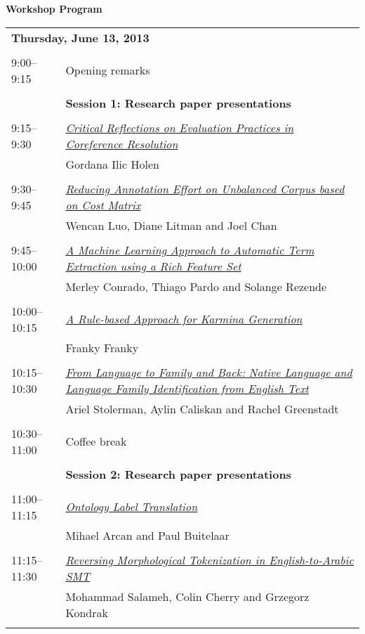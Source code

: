 \setlength{\parindent}{0in}
\setlength{\parskip}{2ex}
\renewcommand{\baselinestretch}{0.87}

\begin{center}
{\Large \bf
  Workshop Program
}
\end{center}
\vspace{3mm}
\begin{tabular}{p{20mm}p{128mm}}
\multicolumn{2}{l}{\bf Thursday, June 13, 2013
} \\
\\
9:00--9:15 & Opening remarks
 \\
\\
 & {\bf Session 1: Research paper presentations
} \\
\\
9:15--9:30 & \hyperlink{page.1}{\em Critical Reflections on Evaluation Practices in Coreference Resolution}\\
         & Gordana Ilic Holen \\
\\

9:30--9:45 & \hyperlink{page.8}{\em Reducing Annotation Effort on Unbalanced Corpus based on Cost Matrix}\\
         & Wencan Luo, Diane Litman and Joel Chan \\
\\

9:45--10:00 & \hyperlink{page.16}{\em A Machine Learning Approach to Automatic Term Extraction using a Rich Feature Set}\\
         & Merley Conrado, Thiago Pardo and Solange Rezende \\
\\

10:00--10:15 & \hyperlink{page.24}{\em A Rule-based Approach for Karmina Generation}\\
         & Franky Franky \\
\\

10:15--10:30 & \hyperlink{page.32}{\em From Language to Family and Back: Native Language and Language Family Identification from English Text}\\
         & Ariel Stolerman, Aylin Caliskan and Rachel Greenstadt \\
\\

10:30--11:00 &  Coffee break
 \\
\\
 & {\bf Session 2: Research paper presentations
} \\
\\
11:00--11:15 & \hyperlink{page.40}{\em Ontology Label Translation}\\
         & Mihael Arcan and Paul Buitelaar \\
\\

11:15--11:30 & \hyperlink{page.47}{\em Reversing Morphological Tokenization in English-to-Arabic SMT}\\
         & Mohammad Salameh, Colin Cherry and Grzegorz Kondrak \\
\\

\end{tabular}
